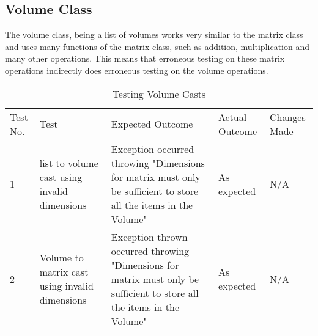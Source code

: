 \subsection{Volume Class}
The volume class, being a list of volumes works very similar to the matrix class and uses many functions of the matrix class, such as addition, multiplication and many other operations. This means that erroneous testing on these matrix operations indirectly does erroneous testing on the volume operations. 

\begin{table}[H]
\centering
    \begin{tabular}{|p{1cm}|p{4cm}|p{4cm}|p{3cm}|p{2cm}|}
        \hline
        Test No. & Test & Expected Outcome & Actual Outcome & Changes Made \\ \cline{1-5} 
        1 & list to volume cast using invalid dimensions & Exception occurred throwing "Dimensions for matrix must only be sufficient to store all the items in the Volume"  & As expected & N/A \\
        \cline{1-5}
        2 & Volume to matrix cast using invalid dimensions & Exception thrown occurred throwing "Dimensions for matrix must only be sufficient to store all the items in the Volume" & As expected & N/A \\ \cline{1-5}
    \end{tabular}
    \caption{Testing Volume Casts}
    \vspace{0.5cm}
\end{table}